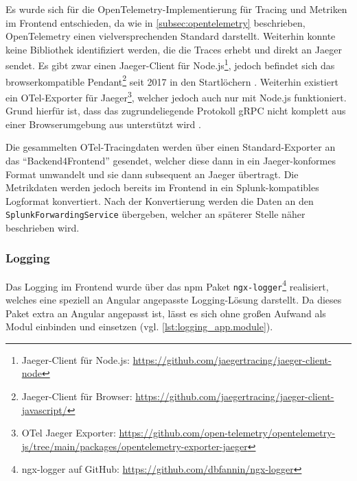 Es wurde sich für die OpenTelemetry-Implementierung für Tracing und Metriken im Frontend entschieden, da wie in \autoref{subsec:opentelemetry} beschrieben, OpenTelemetry einen vielversprechenden Standard darstellt. Weiterhin konnte keine Bibliothek identifiziert werden, die die Traces erhebt und direkt an Jaeger sendet. Es gibt zwar einen Jaeger-Client für Node.js\footnote{Jaeger-Client für Node.js: \url{https://github.com/jaegertracing/jaeger-client-node}}, jedoch befindet sich das browserkompatible Pendant\footnote{Jaeger-Client für Browser: \url{https://github.com/jaegertracing/jaeger-client-javascript/}} seit 2017 in den Startlöchern \cite{JaegerJSClientUsageInABrowser}. Weiterhin existiert ein OTel-Exporter für Jaeger\footnote{OTel Jaeger Exporter: \url{https://github.com/open-telemetry/opentelemetry-js/tree/main/packages/opentelemetry-exporter-jaeger}}, welcher jedoch auch nur mit Node.js funktioniert. Grund hierfür ist, dass das zugrundeliegende Protokoll gRPC \cite{grpc} nicht komplett aus einer Browserumgebung aus unterstützt wird \cite{grpcWebLimitations}.


Die gesammelten OTel-Tracingdaten werden über einen Standard-Exporter an das \enquote{Backend4Frontend} gesendet, welcher diese dann in ein Jaeger-konformes Format umwandelt und sie dann subsequent an Jaeger übertragt. Die Metrikdaten werden jedoch bereits im Frontend in ein Splunk-kompatibles Logformat konvertiert. Nach der Konvertierung werden die Daten an den \texttt{SplunkForwardingService} übergeben, welcher an späterer Stelle näher beschrieben wird.

\subsubsection{Logging}

Das Logging im Frontend wurde über das npm \cite{NPM} Paket \texttt{ngx-logger}\footnote{ngx-logger auf GitHub: \url{https://github.com/dbfannin/ngx-logger}} realisiert, welches eine speziell an Angular angepasste Logging-Lösung darstellt. Da dieses Paket extra an Angular angepasst ist, lässt es sich ohne großen Aufwand als Modul einbinden und einsetzen (vgl. \autoref{lst:logging_app.module}).




